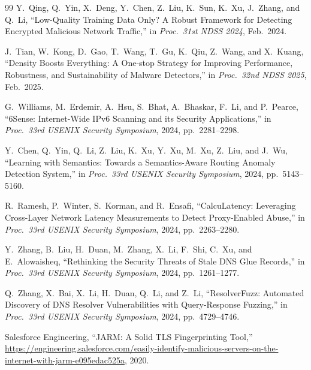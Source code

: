 \begin{thebibliography}{99}
Y.~Qing, Q.~Yin, X.~Deng, Y.~Chen, Z.~Liu, K.~Sun, K.~Xu, J.~Zhang, and Q.~Li,
``Low-Quality Training Data Only? A Robust Framework for Detecting Encrypted Malicious Network Traffic,''
in \textit{Proc.\ 31st NDSS 2024}, Feb.\ 2024.

J.~Tian, W.~Kong, D.~Gao, T.~Wang, T.~Gu, K.~Qiu, Z.~Wang, and X.~Kuang,
``Density Boosts Everything: A One-stop Strategy for Improving Performance, Robustness, and Sustainability of Malware Detectors,''
in \textit{Proc.\ 32nd NDSS 2025}, Feb.\ 2025.

G.~Williams, M.~Erdemir, A.~Hsu, S.~Bhat, A.~Bhaskar, F.~Li, and P.~Pearce,
``6Sense: Internet-Wide IPv6 Scanning and its Security Applications,''
in \textit{Proc.\ 33rd USENIX Security Symposium}, 2024, pp.\ 2281--2298.

Y.~Chen, Q.~Yin, Q.~Li, Z.~Liu, K.~Xu, Y.~Xu, M.~Xu, Z.~Liu, and J.~Wu,
``Learning with Semantics: Towards a Semantics-Aware Routing Anomaly Detection System,''
in \textit{Proc.\ 33rd USENIX Security Symposium}, 2024, pp.\ 5143--5160.

R.~Ramesh, P.~Winter, S.~Korman, and R.~Ensafi,
``CalcuLatency: Leveraging Cross-Layer Network Latency Measurements to Detect Proxy-Enabled Abuse,''
in \textit{Proc.\ 33rd USENIX Security Symposium}, 2024, pp.\ 2263--2280.

Y.~Zhang, B.~Liu, H.~Duan, M.~Zhang, X.~Li, F.~Shi, C.~Xu, and E.~Alowaisheq,
``Rethinking the Security Threats of Stale DNS Glue Records,''
in \textit{Proc.\ 33rd USENIX Security Symposium}, 2024, pp.\ 1261--1277.

Q.~Zhang, X.~Bai, X.~Li, H.~Duan, Q.~Li, and Z.~Li,
``ResolverFuzz: Automated Discovery of DNS Resolver Vulnerabilities with Query-Response Fuzzing,''
in \textit{Proc.\ 33rd USENIX Security Symposium}, 2024, pp.\ 4729--4746.

Salesforce Engineering,
``JARM: A Solid TLS Fingerprinting Tool,''
\url{https://engineering.salesforce.com/easily-identify-malicious-servers-on-the-internet-with-jarm-e095edac525a}, 2020.

\end{thebibliography}


